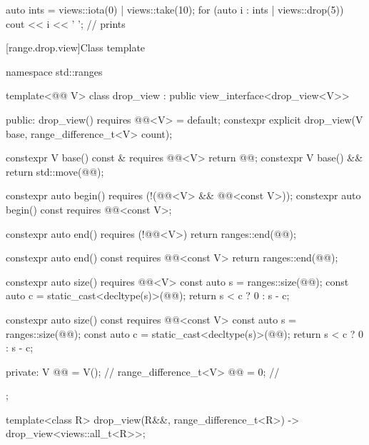 \pnum
\begin{example}
\begin{codeblock}
auto ints = views::iota(0) | views::take(10);
for (auto i : ints | views::drop(5)) {
  cout << i << ' ';                             // prints 
}
\end{codeblock}
\end{example}

[range.drop.view]{Class template }

%
%
%
%
\begin{codeblock}
namespace std::ranges {
  template<@@ V>
  class drop_view : public view_interface<drop_view<V>> {
  public:
    drop_view() requires @@<V> = default;
    constexpr explicit drop_view(V base, range_difference_t<V> count);

    constexpr V base() const & requires @@<V> { return @@; }
    constexpr V base() && { return std::move(@@); }

    constexpr auto begin()
      requires (!(@@<V> && @@<const V>));
    constexpr auto begin() const requires @@<const V>;

    constexpr auto end() requires (!@@<V>)
    { return ranges::end(@@); }

    constexpr auto end() const requires @@<const V>
    { return ranges::end(@@); }

    constexpr auto size() requires @@<V> {
      const auto s = ranges::size(@@);
      const auto c = static_cast<decltype(s)>(@@);
      return s < c ? 0 : s - c;
    }

    constexpr auto size() const requires @@<const V> {
      const auto s = ranges::size(@@);
      const auto c = static_cast<decltype(s)>(@@);
      return s < c ? 0 : s - c;
    }

  private:
    V @@ = V();                              // \expos
    range_difference_t<V> @@ = 0;           // \expos
  };

  template<class R>
    drop_view(R&&, range_difference_t<R>) -> drop_view<views::all_t<R>>;
}
\end{codeblock}

